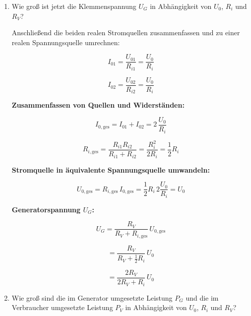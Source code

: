 {\begin {enumerate}[label=\alph*)]
\[
= \frac{1}{200 R_i}\, U_0^2
\]

\medskip
\textbf{Klemmenspannung $U_G$:}

\[
\Rightarrow\; U_G = U_{01} - R_{i1} I_1
\]

\[
= 1{,}1\, U_0 - R_i \frac{1}{20 R_i} U_0
\quad \text{mit } R_{i1} = R_i
\]

\[
= 1{,}05\, U_0
\]


        Für die weiteren Teilaufgaben soll der Generator mit dem Verbraucher $R_V$
        belastet werden. Es gelte weiter $U_0 = U_{01} = U_{02}$ und
        $R_i = R_{i1} = R_{i2}$.


        \item Wie groß ist jetzt die Klemmenspannung $U_G$ in Abhängigkeit
            von $U_0$, $R_i$ und $R_V$?

    \begin{center}
    
    \end{center}

    Anschließend die beiden realen Stromquellen zusammenfassen und zu einer realen Spannungsquelle umrechnen: 

       \begin{center}
    
    \end{center}

    \[
I_{01} = \frac{U_{01}}{R_{i1}} = \frac{U_0}{R_i}
\]

\[
I_{02} = \frac{U_{02}}{R_{i2}} = \frac{U_0}{R_i}
\]

\medskip
\textbf{Zusammenfassen von Quellen und Widerständen:}

\[
I_{0,\mathrm{ges}} = I_{01} + I_{02}
= 2\,\frac{U_0}{R_i}
\]

\[
R_{i,\mathrm{ges}}
= \frac{R_{i1} R_{i2}}{R_{i1} + R_{i2}}
= \frac{R_i^2}{2 R_i}
= \frac{1}{2} R_i
\]

\textbf{Stromquelle in äquivalente Spannungsquelle umwandeln:}

\[
U_{0,\mathrm{ges}}
= R_{i,\mathrm{ges}}\, I_{0,\mathrm{ges}}
= \frac{1}{2} R_i \, 2 \frac{U_0}{R_i}
= U_0
\]

\medskip
\textbf{Generatorspannung $U_G$:}

\[
U_G
= \frac{R_V}{R_V + R_{i,\mathrm{ges}}}\, U_{0,\mathrm{ges}}
\]

\[
= \frac{R_V}{R_V + \tfrac{1}{2} R_i}\, U_0
\]

\[
= \frac{2 R_V}{2 R_V + R_i}\, U_0
\]


        \item Wie groß sind die im Generator umgesetzte Leistung $P_G$ und
            die im Verbraucher umgesetzte Leistung $P_V$ in Abhängigkeit
            von $U_0$, $R_i$ und $R_V$?



\end{enumerate}}
